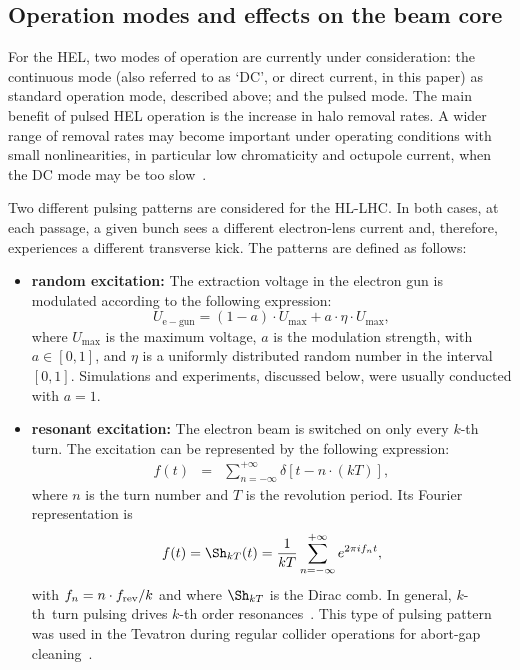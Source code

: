 \documentclass[%
 reprint,
 amsmath,amssymb,
 aps,
prstab,
longbibliography
]{revtex4-1}
\begin{document}
\subsection{Operation modes and effects on the beam core}
\label{sec:hel:core}

For the HEL, two modes of operation are currently under consideration:
the continuous mode (also referred to as `DC', or direct current, in
this paper) as standard operation mode, described above; and the
pulsed mode. The main benefit of pulsed HEL operation is the increase
in halo removal rates. A wider range of removal rates may become
important under operating conditions with small nonlinearities, in
particular low chromaticity and octupole current, when the DC mode may
be too slow~\cite{hel_halo_hllhc_fitterer, hl_halo_ipac2017}.

Two different pulsing patterns are considered for the HL-LHC. In both
cases, at each passage, a given bunch sees a different electron-lens
current and, therefore, experiences a different transverse kick. The
patterns are defined as follows:

\begin{itemize}

\item \textbf{random excitation:} The extraction voltage in the
  electron gun is modulated according to the
  following expression:
%
  \begin{equation}
    \label{eq:random}
    U_{\mathrm{e-gun}} = (1-a) \cdot U_{\mathrm{max}} +
    a \cdot \eta \cdot U_{\mathrm{max}},
  \end{equation}
%
  where $U_{\mathrm{max}}$ is the maximum voltage, $a$ is the
  modulation strength, with $a \in [0,1]$, and $\eta$ is a uniformly
  distributed random number in the interval~$[0,1]$. Simulations and
  experiments, discussed below, were usually conducted with $a = 1$.

\item \textbf{resonant excitation:} The electron beam is switched on
  only every $k$-th turn. The excitation can be represented
  by the following expression:
  \begin{eqnarray}
    \label{intro:eqn:1}
    f(t) & = & \sum_{n=-\infty}^{+\infty}\delta\left[t-n\cdot(kT)\right],
  \end{eqnarray}
  where $n$ is the turn number and $T$ is the revolution period. Its
  Fourier representation is
  \begin{equation}
    \label{intro:eqn:2}
    f(t) = \Sh_{kT}(t) = \frac{1}{kT}\sum_{n=-\infty}^{+\infty}e^{2\pi i f_nt},
  \end{equation}
  with $f_n = n \cdot f_{\rm rev} / k$ and where $\Sh_{kT}$ is the
  Dirac comb. In general, $k$-th~turn pulsing drives $k$-th order
  resonances~\cite{md_sim_hel_res_ex_fitterer}. This type of pulsing
  pattern was used in the Tevatron during regular collider operations
  for abort-gap cleaning~\cite{hel_tevatron_abortgap_zhang}.
\end{itemize}
\end{document}
